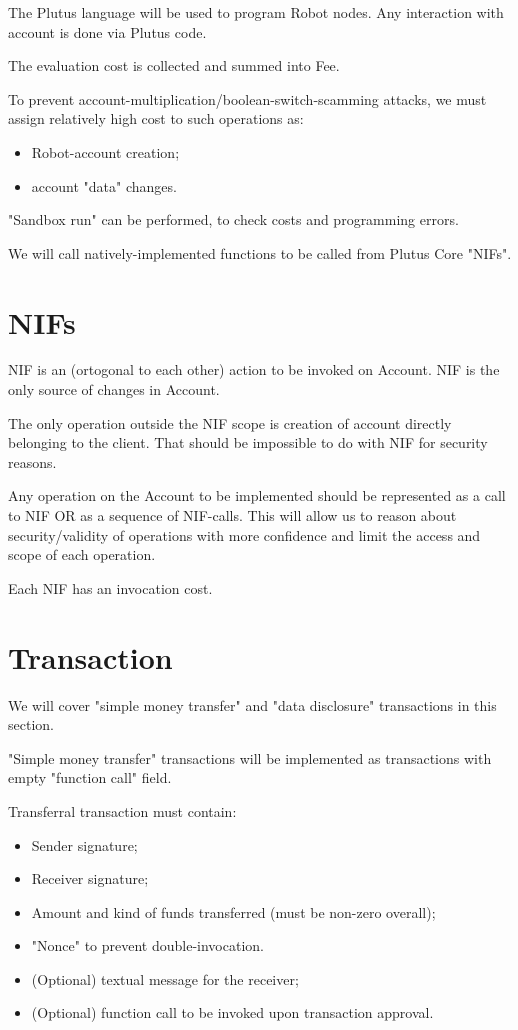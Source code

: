 \documentclass[a4paper]{article}
\begin{document}
The Plutus language \cite{plutus} will be used to program Robot nodes.
Any interaction with account is done via Plutus code.

The evaluation cost is collected and summed into Fee.

To prevent account-multiplication/boolean-switch-scamming attacks, we must assign relatively high cost to such operations as:
\begin{itemize}
  \item Robot-account creation;
  \item account "data" changes.
\end{itemize}

"Sandbox run" can be performed, to check costs and programming errors.

We will call natively-implemented functions to be called from Plutus Core "NIFs".

\section*{NIFs}

NIF is an (ortogonal to each other) action to be invoked on Account.
NIF is the only source of changes in Account.

The only operation outside the NIF scope is creation of account directly belonging to the client.
That should be impossible to do with NIF for security reasons.

Any operation on the Account to be implemented should be represented as a call to NIF OR as a sequence of NIF-calls.
This will allow us to reason about security/validity of operations with more confidence and limit the access and scope of each operation.

Each NIF has an invocation cost.

\section*{Transaction}

We will cover "simple money transfer" and "data disclosure" transactions in this section.

"Simple money transfer" transactions will be implemented as transactions with empty "function call" field.

Transferral transaction must contain:
\begin{itemize}
  \item Sender signature;
  \item Receiver signature;
  \item Amount and kind of funds transferred (must be non-zero overall);
  \item "Nonce" to prevent double-invocation.
  \item (Optional) textual message for the receiver;
  \item (Optional) function call to be invoked upon transaction approval.
\end{itemize}
\end{document}
